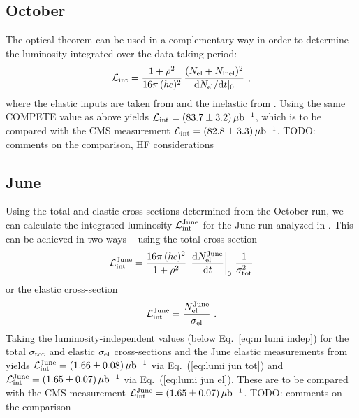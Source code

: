 \documentclass[doublecol]{../macros/epl2}
\def\d{{\rm d}}
\def\un#1{\,{\rm #1}}
\begin{document}
\subsection{October}

The optical theorem can be used in a complementary way in order to determine the luminosity integrated over the data-taking period:
\begin{equation}
\label{eq:lumi oct}
{\cal L_{\rm int}} = {1 + \rho^2 \over 16\pi\, (\hbar c)^2}\, { (N_{\rm el} + N_{\rm inel})^2 \over \d N_{\rm el}/\d t|_0 }\ ,
\end{equation}
where the elastic inputs are taken from \cite{P1} and the inelastic from \cite{P2}. Using the same COMPETE value as above yields ${\cal L_{\rm int}} = (83.7 \pm 3.2) \un{\mu b^{-1}}$, which is to be compared with the CMS measurement ${\cal L_{\rm int}} = (82.8 \pm 3.3) \un{\mu b^{-1}}$. TODO: comments on the comparison, HF considerations

\subsection{June}

Using the total and elastic cross-sections determined from the October run, we can calculate the integrated luminosity ${\cal L}_{\rm int}^{\rm June}$ for the June run analyzed in \cite{epl96}. This can be achieved in two ways -- using the total cross-section
\begin{equation}
\label{eq:lumi jun tot}
{\cal L}_{\rm int}^{\rm June} =  {16\pi\, (\hbar c)^2\over 1 + \rho^2}\, \left. \d N_{\rm el}^{\rm June}\over\d t\right|_0\, {1\over \sigma_{\rm tot}^2}
\end{equation}
or the elastic cross-section
\begin{equation}
\label{eq:lumi jun el}
{\cal L}_{\rm int}^{\rm June} = {N_{\rm el}^{\rm June}\over \sigma_{\rm el}}\ .
\end{equation}
Taking the luminosity-independent values (below Eq.~\ref{eq:m lumi indep}) for the total $\sigma_{\rm tot}$ and elastic $\sigma_{\rm el}$ cross-sections and the June elastic measurements from \cite{epl96} yields
${\cal L}_{\rm int}^{\rm June} = (1.66 \pm 0.08)\un{\mu b^{-1}}$ via Eq.~(\ref{eq:lumi jun tot}) and
${\cal L}_{\rm int}^{\rm June} = (1.65 \pm 0.07)\un{\mu b^{-1}}$ via Eq.~(\ref{eq:lumi jun el}). These are to be compared with the CMS measurement
${\cal L}_{\rm int}^{\rm June} = (1.65 \pm 0.07)\un{\mu b^{-1}}$. TODO: comments on the comparison
\end{document}
